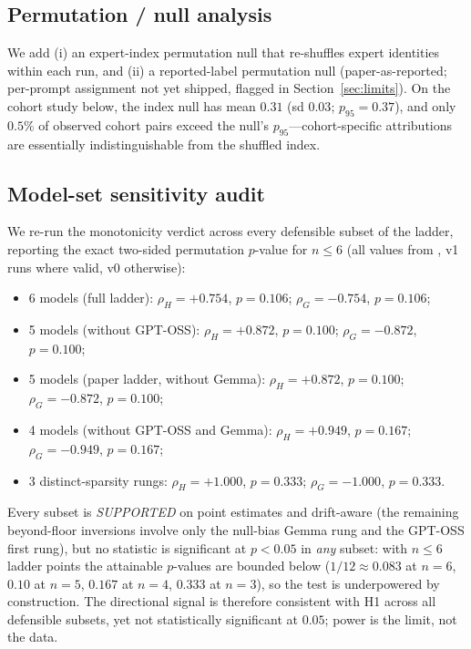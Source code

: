 \documentclass[sigconf]{acmart}
\begin{document}
\subsection{Permutation / null analysis}
We add (i) an expert-index permutation null that re-shuffles expert
identities within each run, and (ii) a reported-label permutation null
(paper-as-reported; per-prompt assignment not yet shipped, flagged in
Section~\ref{sec:limits}). On the cohort study below, the index null has
mean $0.31$ (sd $0.03$; $p_{95} = 0.37$), and only $0.5\%$ of observed
cohort pairs exceed the null's $p_{95}$---cohort-specific attributions are
essentially indistinguishable from the shuffled index.

\subsection{Model-set sensitivity audit}
\label{sec:verdict}
We re-run the monotonicity verdict across every defensible subset of the
ladder, reporting the exact two-sided permutation $p$-value for $n \le 6$
(all values from , v1 runs where valid,
v0 otherwise):
\begin{itemize}
\item 6 models (full ladder): $\rho_H = +0.754$, $p = 0.106$; $\rho_G = -0.754$, $p = 0.106$;
\item 5 models (without GPT-OSS): $\rho_H = +0.872$, $p = 0.100$; $\rho_G = -0.872$, $p = 0.100$;
\item 5 models (paper ladder, without Gemma): $\rho_H = +0.872$, $p = 0.100$; $\rho_G = -0.872$, $p = 0.100$;
\item 4 models (without GPT-OSS and Gemma): $\rho_H = +0.949$, $p = 0.167$; $\rho_G = -0.949$, $p = 0.167$;
\item 3 distinct-sparsity rungs: $\rho_H = +1.000$, $p = 0.333$; $\rho_G = -1.000$, $p = 0.333$.
\end{itemize}
Every subset is \emph{SUPPORTED} on point estimates and drift-aware (the
remaining beyond-floor inversions involve only the null-bias Gemma rung and
the GPT-OSS first rung), but no statistic is significant at $p < 0.05$ in
\emph{any} subset: with $n \le 6$ ladder points the attainable
$p$-values are bounded below ($1/12 \approx 0.083$ at $n = 6$, $0.10$ at
$n = 5$, $0.167$ at $n = 4$, $0.333$ at $n = 3$), so the test is
underpowered by construction. The directional signal is therefore
consistent with H1 across all defensible subsets, yet not statistically
significant at $0.05$; power is the limit, not the data.
\end{document}
